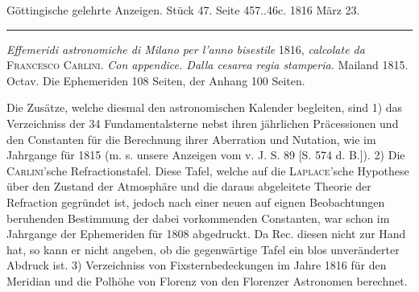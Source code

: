 \clearpage
{}

\begin{center}\small Göttingische gelehrte Anzeigen. Stück 47. Seite 457..46c. 1816 März 23.\\[3pt]\rule{.72\linewidth}{.3pt}\end{center}

\emph{Effemeridi astronomiche di Milano per l’anno bisestile} 1816, \emph{calcolate da} \textsc{Francesco Carlini}. \emph{Con appendice. Dalla cesarea regia stamperia.} Mailand 1815. Octav. Die Ephemeriden 108 Seiten, der Anhang 100 Seiten.

Die Zusätze, welche diesmal den astronomischen Kalender begleiten, sind 1) das Verzeichniss der 34 Fundamentalsterne nebst ihren jährlichen Präcessionen und den Constanten für die Berechnung ihrer Aberration und Nutation, wie im Jahrgange für 1815 (m. s. unsere Anzeigen vom v. J. S. 89 [S. 574 d. B.]). 2) Die \textsc{Carlini}'sche Refractionstafel. Diese Tafel, welche auf die \textsc{Laplace}'sche Hypothese über den Zustand der Atmosphäre und die daraus abgeleitete Theorie der Refraction gegründet ist, jedoch nach einer neuen auf eignen Beobachtungen beruhenden Bestimmung der dabei vorkommenden Constanten, war schon im Jahrgange der Ephemeriden für 1808 abgedruckt. Da Rec. diesen nicht zur Hand hat, so kann er nicht angeben, ob die gegenwärtige Tafel ein blos unveränderter Abdruck ist. 3) Verzeichniss von Fixsternbedeckungen im Jahre 1816 für den Meridian und die Polhöhe von Florenz von den Florenzer Astronomen berechnet.

